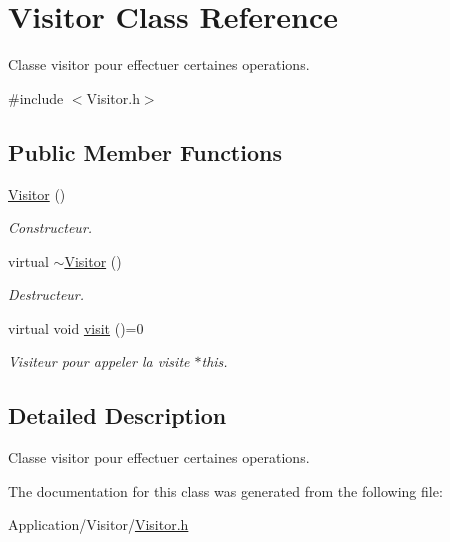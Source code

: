 \hypertarget{class_visitor}{\section{Visitor Class Reference}
\label{class_visitor}
}


Classe visitor pour effectuer certaines operations.  




{\ttfamily \#include $<$Visitor.\-h$>$}

\subsection*{Public Member Functions}
\begin{DoxyCompactItemize}
\item 
\hypertarget{class_visitor_a2a243fcf1a532722b2c0b857a327937c}{\hyperlink{class_visitor_a2a243fcf1a532722b2c0b857a327937c}{Visitor} ()}\label{class_visitor_a2a243fcf1a532722b2c0b857a327937c}

\begin{DoxyCompactList}\small\item\em Constructeur. \end{DoxyCompactList}\item 
\hypertarget{class_visitor_a2c9cc57ee3a518a193ea88384cbf3937}{virtual \hyperlink{class_visitor_a2c9cc57ee3a518a193ea88384cbf3937}{$\sim$\-Visitor} ()}\label{class_visitor_a2c9cc57ee3a518a193ea88384cbf3937}

\begin{DoxyCompactList}\small\item\em Destructeur. \end{DoxyCompactList}\item 
\hypertarget{class_visitor_a50d8d1008814cdf21ba2dcf555f93bd2}{virtual void \hyperlink{class_visitor_a50d8d1008814cdf21ba2dcf555f93bd2}{visit} ()=0}\label{class_visitor_a50d8d1008814cdf21ba2dcf555f93bd2}

\begin{DoxyCompactList}\small\item\em Visiteur pour appeler la visite $\ast$this. \end{DoxyCompactList}\end{DoxyCompactItemize}


\subsection{Detailed Description}
Classe visitor pour effectuer certaines operations. 

The documentation for this class was generated from the following file\-:\begin{DoxyCompactItemize}
\item 
Application/\-Visitor/\hyperlink{_visitor_8h}{Visitor.\-h}\end{DoxyCompactItemize}
